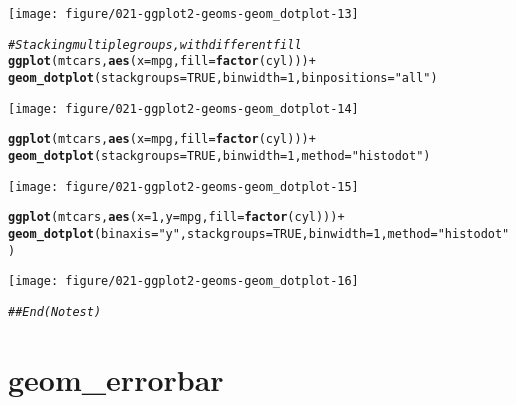 \documentclass[a4paper,titlepage]{tufte-handout}\usepackage[]{graphicx}\usepackage[]{color}
\makeatletter
\def\maxwidth{ %
  \ifdim\Gin@nat@width>\linewidth
    \linewidth
  \else
    \Gin@nat@width
  \fi
}
\newcommand{\hlnum}[1]{\textcolor[rgb]{0.686,0.059,0.569}{#1}}%
\newcommand{\hlstr}[1]{\textcolor[rgb]{0.192,0.494,0.8}{#1}}%
\newcommand{\hlcom}[1]{\textcolor[rgb]{0.678,0.584,0.686}{\textit{#1}}}%
\newcommand{\hlopt}[1]{\textcolor[rgb]{0,0,0}{#1}}%
\newcommand{\hlstd}[1]{\textcolor[rgb]{0.345,0.345,0.345}{#1}}%
\newcommand{\hlkwc}[1]{\textcolor[rgb]{0.333,0.667,0.333}{#1}}%
\newcommand{\hlkwd}[1]{\textcolor[rgb]{0.737,0.353,0.396}{\textbf{#1}}}%
\newenvironment{kframe}{%
 \def\at@end@of@kframe{}%
 \ifinner\ifhmode%
  \def\at@end@of@kframe{\end{minipage}}%
  \begin{minipage}{\columnwidth}%
 \fi\fi%
 \def\FrameCommand##1{\hskip\@totalleftmargin \hskip-\fboxsep
 \colorbox{shadecolor}{##1}\hskip-\fboxsep
     \hskip-\linewidth \hskip-\@totalleftmargin \hskip\columnwidth}%
 \MakeFramed {\advance\hsize-\width
   \@totalleftmargin\z@ \linewidth\hsize
   \@setminipage}}%
 {\par\unskip\endMakeFramed%
 \at@end@of@kframe}
\newenvironment{knitrout}{}{} %
\makeatother
\begin{document}
\begin{knitrout}
\begin{kframe}
{\ttfamily\noindent\itshape\color{messagecolor}{\#\# `stat\_bindot()` using `bins = 30`. Pick better value with `binwidth`.}}\end{kframe}
\texttt{[image: figure/021-ggplot2-geoms-geom\_dotplot-13]} 
\begin{kframe}\begin{alltt}
\hlcom{# Stacking multiple groups, with different fill}
\hlkwd{ggplot}\hlstd{(mtcars,} \hlkwd{aes}\hlstd{(}\hlkwc{x} \hlstd{= mpg,} \hlkwc{fill} \hlstd{=} \hlkwd{factor}\hlstd{(cyl)))} \hlopt{+}
  \hlkwd{geom_dotplot}\hlstd{(}\hlkwc{stackgroups} \hlstd{=} \hlnum{TRUE}\hlstd{,} \hlkwc{binwidth} \hlstd{=} \hlnum{1}\hlstd{,} \hlkwc{binpositions} \hlstd{=} \hlstr{"all"}\hlstd{)}
\end{alltt}
\end{kframe}
\texttt{[image: figure/021-ggplot2-geoms-geom\_dotplot-14]} 
\begin{kframe}\begin{alltt}
\hlkwd{ggplot}\hlstd{(mtcars,} \hlkwd{aes}\hlstd{(}\hlkwc{x} \hlstd{= mpg,} \hlkwc{fill} \hlstd{=} \hlkwd{factor}\hlstd{(cyl)))} \hlopt{+}
  \hlkwd{geom_dotplot}\hlstd{(}\hlkwc{stackgroups} \hlstd{=} \hlnum{TRUE}\hlstd{,} \hlkwc{binwidth} \hlstd{=} \hlnum{1}\hlstd{,} \hlkwc{method} \hlstd{=} \hlstr{"histodot"}\hlstd{)}
\end{alltt}
\end{kframe}
\texttt{[image: figure/021-ggplot2-geoms-geom\_dotplot-15]} 
\begin{kframe}\begin{alltt}
\hlkwd{ggplot}\hlstd{(mtcars,} \hlkwd{aes}\hlstd{(}\hlkwc{x} \hlstd{=} \hlnum{1}\hlstd{,} \hlkwc{y} \hlstd{= mpg,} \hlkwc{fill} \hlstd{=} \hlkwd{factor}\hlstd{(cyl)))} \hlopt{+}
  \hlkwd{geom_dotplot}\hlstd{(}\hlkwc{binaxis} \hlstd{=} \hlstr{"y"}\hlstd{,} \hlkwc{stackgroups} \hlstd{=} \hlnum{TRUE}\hlstd{,} \hlkwc{binwidth} \hlstd{=} \hlnum{1}\hlstd{,} \hlkwc{method} \hlstd{=} \hlstr{"histodot"}\hlstd{)}
\end{alltt}
\end{kframe}
\texttt{[image: figure/021-ggplot2-geoms-geom\_dotplot-16]} 
\begin{kframe}\begin{alltt}
\hlcom{## End(No test)}
\end{alltt}
\end{kframe}
\end{knitrout}


\section{geom\_errorbar}
\end{document}
